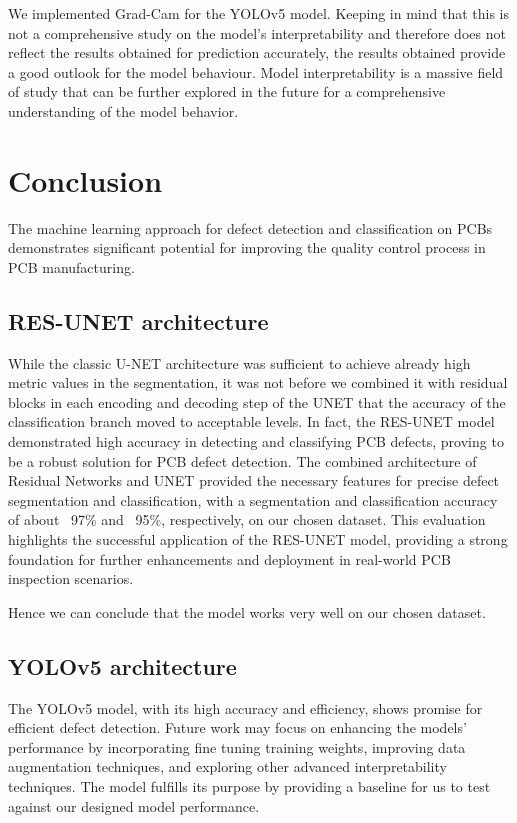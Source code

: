 \documentclass[12pt]{article}
\begin{document}
We implemented Grad-Cam for the YOLOv5 model. Keeping in mind that this is not a comprehensive study on the model's interpretability and therefore does not reflect the results obtained for prediction accurately, the results obtained provide a good outlook for the model behaviour. 
Model interpretability is a massive field of study that can be further explored in the future for a comprehensive understanding of the model behavior.

\clearpage
\newpage

\section{Conclusion}

The machine learning approach for defect detection and classification on PCBs demonstrates significant potential for improving the quality control process in PCB manufacturing. 

\subsection{RES-UNET architecture}
While the classic U-NET architecture was sufficient to achieve already high metric values in the segmentation, it was not before we combined it with residual blocks in each encoding and decoding step of the UNET that the accuracy of the classification branch moved to acceptable levels. In fact, the RES-UNET model demonstrated high accuracy in detecting and classifying PCB defects, proving to be a robust solution for PCB defect detection. The combined architecture of Residual Networks and UNET provided the necessary features for precise defect segmentation and classification,  with a segmentation and classification accuracy of about ~97\% and ~95\%, respectively, on our chosen dataset. This evaluation highlights the successful application of the RES-UNET model, providing a strong foundation for further enhancements and deployment in real-world PCB inspection scenarios.

Hence we can conclude that the model works very well on our chosen dataset.

\subsection{YOLOv5 architecture}
The YOLOv5 model, with its high accuracy and efficiency, shows promise for efficient defect detection. Future work may focus on enhancing the models' performance by incorporating fine tuning training weights, improving data augmentation techniques, and exploring other advanced interpretability techniques.
The model fulfills its purpose by providing a baseline for us to test against our designed model performance.
\end{document}
